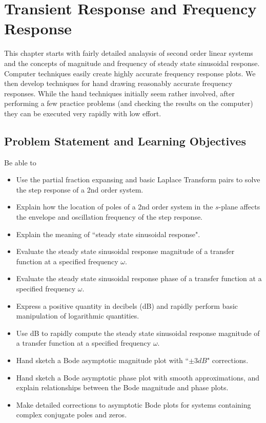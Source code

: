 %
%
%

\chapter{Transient Response and Frequency Response}\label{2ndOrderTransientChapter}

This chapter starts with fairly detailed analaysis of second order linear systems and the concepts of magnitude and frequency of steady state sinusoidal response.  Computer techniques easily create highly accurate frequency response plots.   We then develop   techniques for hand drawing reasonably accurate frequency responses.   While the hand techniques initially seem rather involved, after performing a few practice problems (and checking the results on the computer) they can be executed very rapidly with low effort.

\section{Problem Statement and Learning Objectives}
Be able to
\begin{itemize}
    \item Use the partial fraction expansing and basic Laplace Transform pairs to 
    solve the step response of a 2nd order system. 
    \item Explain how the location of poles of a 2nd order system in the $s$-plane 
    affects the envelope and oscillation frequency of the step response.
    \item Explain the meaning of ``steady state sinusoidal response".
    \item Evaluate the steady state sinusoidal response magnitude of a transfer function 
    at a specified frequency $\omega$.
    \item Evaluate the steady state sinusoidal response phase of a transfer function 
    at a specified frequency $\omega$.
    \item Express a positive quantity in decibels (dB) and rapidly perform basic manipulation of 
    logarithmic quantities. 
    \item Use dB to rapidly compute  the steady state sinusoidal response magnitude of a transfer function 
    at a specified frequency $\omega$.
    
    \item Hand sketch a Bode asymptotic magnitude plot with ``$\pm3dB$" corrections. 
    \item Hand sketch a Bode asymptotic phase plot with smooth approximations,
    and explain relationships between the Bode magnitude and phase plots. 
    \item Make detailed corrections to asymptotic Bode plots for systems containing complex conjugate poles and zeros. 
    
\end{itemize}


